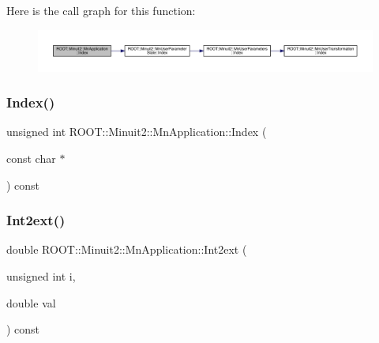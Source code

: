 Here is the call graph for this function\+:\nopagebreak
\begin{figure}[H]
\begin{center}
\leavevmode
\includegraphics[width=350pt]{df/dd5/classROOT_1_1Minuit2_1_1MnApplication_a6b6e2bc386692b9e3cd8a9ad01fc175e_cgraph}
\end{center}
\end{figure}
\mbox{\label{classROOT_1_1Minuit2_1_1MnApplication_a6b6e2bc386692b9e3cd8a9ad01fc175e}} 
\subsubsection{\texorpdfstring{Index()}{Index()}\hspace{0.1cm}{\footnotesize\ttfamily [2/2]}}
{\footnotesize\ttfamily unsigned int R\+O\+O\+T\+::\+Minuit2\+::\+Mn\+Application\+::\+Index (\begin{DoxyParamCaption}\item[{const char $\ast$}]{ }\end{DoxyParamCaption}) const}

\mbox{\label{classROOT_1_1Minuit2_1_1MnApplication_a1ca8337823e271c40f05f6da6ea8e231}} 
\subsubsection{\texorpdfstring{Int2ext()}{Int2ext()}\hspace{0.1cm}{\footnotesize\ttfamily [1/2]}}
{\footnotesize\ttfamily double R\+O\+O\+T\+::\+Minuit2\+::\+Mn\+Application\+::\+Int2ext (\begin{DoxyParamCaption}\item[{unsigned int}]{i,  }\item[{double}]{val }\end{DoxyParamCaption}) const}

